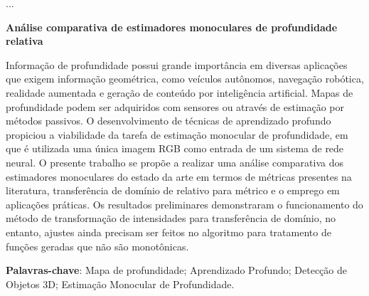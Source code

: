 	\hspace{5mm}
	
	...
	
	\begin{resumo}
	
	  \begin{center}{
	    \textbf{Análise comparativa de estimadores monoculares de profundidade relativa}}
	  \end{center}
	
	\begin{spacing}{1.0}
		Informação de profundidade possui grande importância em diversas aplicações que exigem informação geométrica, como veículos autônomos, navegação robótica, realidade aumentada e geração de conteúdo por inteligência artificial. Mapas de profundidade podem ser adquiridos com sensores ou através de estimação por métodos passivos. O desenvolvimento de técnicas de aprendizado profundo propiciou a viabilidade da tarefa de estimação monocular de profundidade, em que é utilizada uma única imagem RGB como entrada de um sistema de rede neural. O presente trabalho se propõe a realizar uma análise comparativa dos estimadores monoculares do estado da arte em termos de métricas presentes na literatura, transferência de domínio de relativo para métrico e o emprego em aplicações práticas. Os resultados preliminares demonstraram o funcionamento do método de transformação de intensidades para transferência de domínio, no entanto, ajustes ainda precisam ser feitos no algoritmo para tratamento de funções geradas que não são monotônicas.
	\end{spacing}
	{\hspace{-8mm} \bf{Palavras-chave}}: Mapa de profundidade; Aprendizado Profundo; Detecção de Objetos 3D; Estimação Monocular de Profundidade.
	
	\end{resumo}
	
